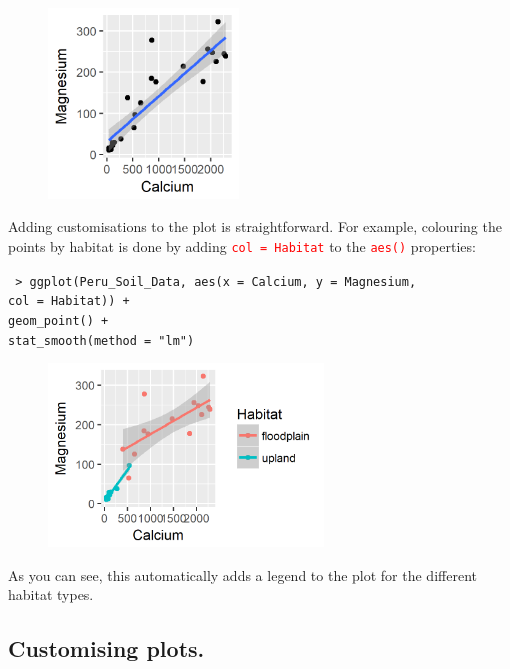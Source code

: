 \documentclass[a4paper,12pt]{article}
\newcommand\code[1]{\textcolor{red}{\texttt{#1}}}
\begin{document}
\begin{figure}[h]
	\centering
	\includegraphics[width=0.45\textwidth]{figs/fig2.png}
	\label{fig:fig2}
\end{figure}

Adding customisations to the plot is straightforward. For example, colouring the points by habitat is done by adding \code{col = Habitat} to the \code{aes()} properties:

\begin{shaded}
\texttt{ > ggplot(Peru\_Soil\_Data, aes(x = Calcium, y = Magnesium, \\
\hspace*{1cm} col = Habitat)) + \\
\hspace*{1cm} geom\_point() + \\
\hspace*{1cm} stat\_smooth(method = "lm")}
\end{shaded}

\begin{figure}[h]
	\centering
	\includegraphics[width=0.65\textwidth]{figs/fig3.png}
	\label{fig:fig3}
\end{figure}

As you can see, this automatically adds a legend to the plot for the different habitat types.

\subsection{Customising plots.}
\end{document}
